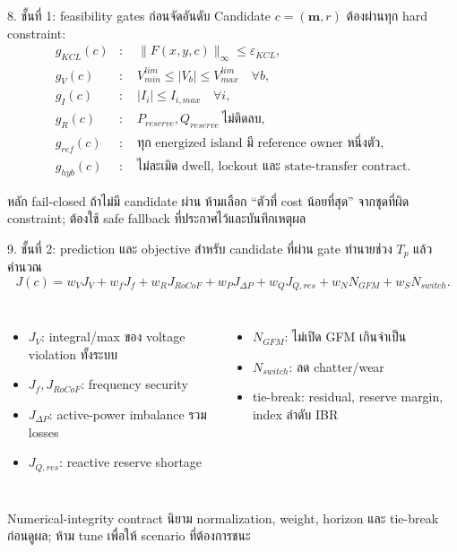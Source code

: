 \documentclass[aspectratio=169,12pt]{beamer}
\begin{document}
\begin{frame}{8. ชั้นที่ 1: feasibility gates ก่อนจัดอันดับ}
Candidate $c=(\mathbf m,r)$ ต้องผ่านทุก hard constraint:
\begin{align*}
g_{KCL}(c)&:\quad \|F(x,y,c)\|_\infty\le\varepsilon_{KCL},\\
g_V(c)&:\quad V_{min}^{lim}\le |V_b|\le V_{max}^{lim}\quad\forall b,\\
g_I(c)&:\quad |I_i|\le I_{i,max}\quad\forall i,\\
g_R(c)&:\quad P_{reserve},Q_{reserve}\ \text{ไม่ติดลบ},\\
g_{ref}(c)&:\quad \text{ทุก energized island มี reference owner หนึ่งตัว},\\
g_{hyb}(c)&:\quad \text{ไม่ละเมิด dwell, lockout และ state-transfer contract}.
\end{align*}
\begin{alertblock}{หลัก fail-closed}
ถ้าไม่มี candidate ผ่าน ห้ามเลือก ``ตัวที่ cost น้อยที่สุด'' จากชุดที่ผิด constraint; ต้องใช้ safe fallback ที่ประกาศไว้และบันทึกเหตุผล
\end{alertblock}
\end{frame}

\begin{frame}{9. ชั้นที่ 2: prediction และ objective}
สำหรับ candidate ที่ผ่าน gate ทำนายช่วง $T_p$ แล้วคำนวณ
\[
J(c)=w_VJ_V+w_fJ_f+w_RJ_{RoCoF}+w_PJ_{\Delta P}
     +w_QJ_{Q,res}+w_NN_{GFM}+w_SN_{switch}.
\]
\begin{columns}[T,onlytextwidth]
\begin{itemize}
  \item $J_V$: integral/max ของ voltage violation ทั้งระบบ
  \item $J_f,J_{RoCoF}$: frequency security
  \item $J_{\Delta P}$: active-power imbalance รวม losses
  \item $J_{Q,res}$: reactive reserve shortage
\end{itemize}
\begin{itemize}
  \item $N_{GFM}$: ไม่เปิด GFM เกินจำเป็น
  \item $N_{switch}$: ลด chatter/wear
  \item tie-break: residual, reserve margin, index ลำดับ IBR
\end{itemize}
\end{columns}
\begin{block}{Numerical-integrity contract}
นิยาม normalization, weight, horizon และ tie-break ก่อนดูผล; ห้าม tune เพื่อให้ scenario ที่ต้องการชนะ
\end{block}
\end{frame}
\end{document}
